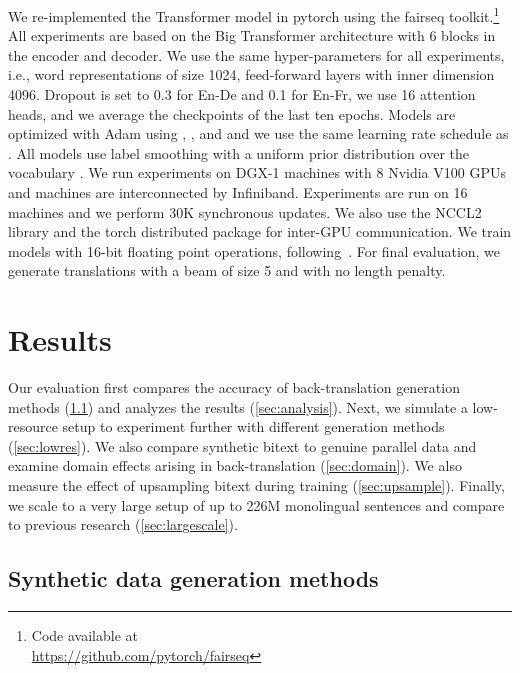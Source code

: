 \documentclass[11pt,a4paper]{article}
\begin{document}
We re-implemented the Transformer model in pytorch using the fairseq toolkit.\footnote{Code available at \\ \url{https://github.com/pytorch/fairseq}} 
All experiments are based on the Big Transformer architecture with 6 blocks in the encoder and decoder. 
We use the same hyper-parameters for all experiments, i.e., word representations of size 1024, feed-forward layers with inner dimension 4096. 
Dropout is set to 0.3 for En-De and 0.1 for En-Fr, we use 16 attention heads, and we average the checkpoints of the last ten epochs.
Models are optimized with Adam \citep{kingma:adam:2015} using , , and  and we use the same learning rate schedule as \citet{vaswani:transformer:2017}.
All models use label smoothing with a uniform prior distribution over the vocabulary  \citep{szegedy:inception:2015,pereyra:regularize:2017}. 
We run experiments on DGX-1 machines with 8 Nvidia V100 GPUs and machines are interconnected by Infiniband.
Experiments are run on 16 machines and we perform 30K synchronous updates.
We also use the NCCL2 library and the torch distributed package for inter-GPU communication.
We train models with 16-bit floating point operations, following~\citet{ott:scaling:2018}.
For final evaluation, we generate translations with a beam of size 5 and with no length penalty.


\section{Results}
\label{sec:result}

Our evaluation first compares the accuracy of back-translation generation methods (\textsection\ref{sec:genmethod_exp}) and analyzes the results (\textsection\ref{sec:analysis}). 
Next, we simulate a low-resource setup to experiment further with different generation methods (\textsection\ref{sec:lowres}).
We also compare synthetic bitext to genuine parallel data and examine domain effects arising in back-translation (\textsection\ref{sec:domain}). 
We also measure the effect of upsampling bitext during training (\textsection\ref{sec:upsample}). 
Finally, we scale to a very large setup of up to 226M monolingual sentences and compare to previous research (\textsection\ref{sec:largescale}).


\subsection{Synthetic data generation methods}
\label{sec:genmethod_exp}
\end{document}
